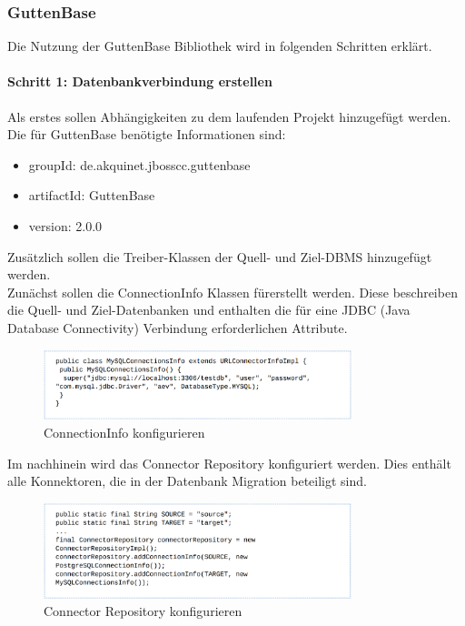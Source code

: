 \subsubsection{GuttenBase}
\label{sec:imp:gb}
Die Nutzung der GuttenBase Bibliothek wird in folgenden Schritten erklärt.
\paragraph*{Schritt 1: Datenbankverbindung erstellen}
Als erstes sollen Abhängigkeiten zu dem laufenden Projekt hinzugefügt werden. Die für GuttenBase benötigte Informationen sind:
\begin{itemize}
	\item groupId: de.akquinet.jbosscc.guttenbase
	\item artifactId: GuttenBase
	\item version: 2.0.0
\end{itemize}
Zusätzlich sollen die Treiber-Klassen der Quell- und Ziel-DBMS hinzugefügt werden.\\
Zunächst sollen die ConnectionInfo Klassen fürerstellt werden. Diese beschreiben die Quell- und Ziel-Datenbanken und enthalten die für eine JDBC (Java Database Connectivity) Verbindung erforderlichen Attribute.\\
\begin{figure}[H]
	\centering
	\includegraphics[width=0.8\textwidth]{images/gb/conInfo}
	\caption{ConnectionInfo konfigurieren}
	\label{img:gb/conInfo}
\end{figure}

Im nachhinein wird das Connector Repository konfiguriert werden. Dies enthält alle Konnektoren, die in der Datenbank Migration beteiligt sind. \\
\begin{figure}[H]
	\centering
	\includegraphics[width=0.8\textwidth]{images/gb/repo}
	\caption{Connector Repository konfigurieren}
	\label{img:gb/repo}
\end{figure}

